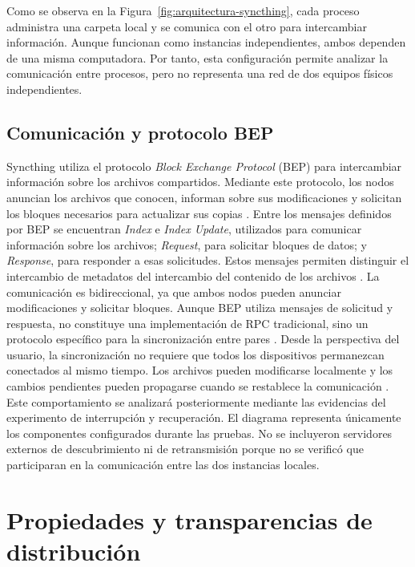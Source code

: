\documentclass[12pt,a4paper]{article}
\begin{document}
Como se observa en la Figura~\ref{fig:arquitectura-syncthing}, cada proceso administra una carpeta local y se comunica con el otro para intercambiar información. Aunque funcionan como instancias independientes, ambos dependen de una misma computadora. Por tanto, esta configuración permite analizar la comunicación entre procesos, pero no representa una red de dos equipos físicos independientes.

\subsection{Comunicación y protocolo BEP}

Syncthing utiliza el protocolo \textit{Block Exchange Protocol} (BEP) para intercambiar información 
sobre los archivos compartidos. Mediante este protocolo, los nodos anuncian los archivos que conocen, informan sobre sus modificaciones y solicitan los bloques necesarios para actualizar sus copias \cite{syncthingBEP}.
Entre los mensajes definidos por BEP se encuentran \textit{Index} e \textit{Index Update}, 
utilizados para comunicar información sobre los archivos; \textit{Request}, para solicitar bloques de datos; y \textit{Response}, para responder a esas solicitudes. Estos mensajes permiten distinguir el intercambio de metadatos del intercambio del contenido de los archivos \cite{syncthingBEP}.
La comunicación es bidireccional, ya que ambos nodos pueden anunciar modificaciones y solicitar bloques. Aunque BEP utiliza mensajes de solicitud y respuesta, no constituye una implementación de RPC tradicional, 
sino un protocolo específico para la sincronización entre pares \cite{syncthingBEP}.
Desde la perspectiva del usuario, la sincronización no requiere que todos los dispositivos permanezcan conectados al mismo tiempo. Los archivos pueden modificarse localmente y los cambios pendientes pueden propagarse cuando se restablece la comunicación \cite{syncthingFAQ}. 
Este comportamiento se analizará posteriormente mediante las evidencias del experimento de interrupción y recuperación.
El diagrama representa únicamente los componentes configurados durante las pruebas. No se incluyeron servidores externos de descubrimiento ni de retransmisión porque no se verificó que participaran en la comunicación entre las dos instancias locales.


\section{Propiedades y transparencias de distribución}
\end{document}
